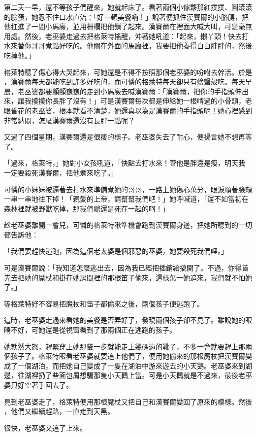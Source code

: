 \documentclass[oneside,10pt]{memoir} %
\begin{document}
第二天一早，還不等孩子們醒來，她就起床了。看著兩個小傢夥那紅撲撲、圓滾滾
的臉蛋，她忍不住口水直流：「好一頓美餐吶！」說著便抓住漢賽爾的小胳膊，把
他扛進了一間小馬廄，並用柵欄把他鎖了起來。漢賽爾在裡面大喊大叫，可是毫無
用處。然後，老巫婆走過去把格萊特搖醒，沖著她吼道：「起來，懶丫頭！快去打
水來替你哥哥煮點好吃的。他關在外面的馬廄裡，我要把他養得白白胖胖的，然後
吃掉他。」

格萊特聽了傷心得大哭起來，可她還是不得不按照那個老巫婆的吩咐去幹活。於是
，漢賽爾每天都能吃到許多好吃的，而可憐的格萊特每天卻只有螃蟹殼吃。每天早
晨，老巫婆都要顫顫巍巍的走到小馬廄去喊漢賽爾：「漢賽爾，把你的手指頭伸出
來，讓我摸摸你長胖了沒有！」可是漢賽爾每次都是伸給她一根啃過的小骨頭，老
眼昏花的老巫婆，根本就看不清楚，她還真以為是漢賽爾的手指頭呢！她心裡感到
非常納悶，怎麼漢賽爾還沒有長胖一點呢？

又過了四個星期，漢賽爾還是很瘦的樣子。老巫婆失去了耐心，便揚言她不想再等了。

「過來，格萊特，」她對小女孩吼道，「快點去打水來！管他是胖還是瘦，明天我
一定要殺死漢賽爾，把他煮來吃了。」

可憐的小妹妹被逼著去打水來準備煮她的哥哥，一路上她傷心萬分，眼淚順著臉頰
一串一串地往下掉！「親愛的上帝，請幫幫我們吧！」她呼喊道，「還不如當初在
森林裡就被野獸吃掉，那我們總還是死在一起的呵！」

趁老巫婆離開一會兒，可憐的格萊特瞅準機會跑到漢賽爾身邊，把她所聽到的一切
都告訴他：

「我們要趕快逃跑，因為這個老太婆是個邪惡的巫婆，她要殺死我們哩。」

可是漢賽爾說：「我知道怎麼逃出去，因為我已經把插銷給搞開了。不過，你得首
先去把她的魔杖和掛在她房間裡的那根笛子偷來，這樣萬一她追來，我們就不怕她
了。」

等格萊特好不容易把魔杖和笛子都偷來之後，兩個孩子便逃跑了。

這時，老巫婆走過來看她的美餐是否弄好了，發現兩個孩子卻不見了。雖說她的眼
睛不好，可她還是從視窗看到了那兩個正在逃跑的孩子。

她勃然大怒，趕緊穿上她那雙一步就能走上幾碼遠的靴子，不多一會就要趕上那兩
個孩子了。格萊特眼看老巫婆就要追上他們了，便用她偷來的那根魔杖把漢賽爾變
成了一個湖泊，而把她自己變成了一隻在湖泊中游來遊去的小天鵝。老巫婆來到湖
邊，往湖裡扔了些面包屑想騙那隻小天鵝上當。可是小天鵝就是不過來，最後老巫
婆只好空著手回去了。

見到老巫婆走了，格萊特便用那根魔杖又把自己和漢賽爾變回了原來的模樣。然後
，他們又繼續趕路，一直走到天黑。

很快，老巫婆又追了上來。
\end{document}

